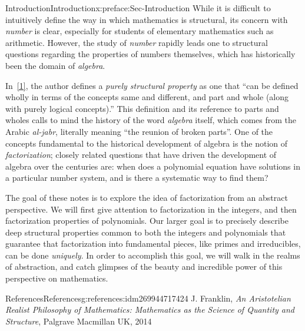 \documentclass[oneside,10pt,]{book}
\numberwithin{equation}{section}
\begin{document}
\begin{preface}{Introduction}{}{Introduction}{}{}{x:preface:Sec-Introduction}
While it is difficult to intuitively define the way in which mathematics is structural, its concern with \emph{number} is clear, especially for students of elementary mathematics such as arithmetic. However, the study of \emph{number} rapidly leads one to structural questions regarding the properties of numbers themselves, which has historically been the domain of \emph{algebra}.%
\par
In~\hyperlink{x:biblio:franklin2014aristotelian}{[1]}, the author defines a \emph{purely structural property} as one that ``can be defined wholly in terms of the concepts same and different, and part and whole (along with purely logical concepts).'' This definition and its reference to parts and wholes calls to mind the history of the word \emph{algebra} itself, which comes from the Arabic \emph{al-jabr}, literally meaning ``the reunion of broken parts''. One of the concepts fundamental to the historical development of algebra is the notion of \emph{factorization}; closely related questions that have driven the development of algebra over the centuries are: when does a polynomial equation have solutions in a particular number system, and is there a systematic way to find them?%
\par
The goal of these notes is to explore the idea of factorization from an abstract perspective. We will first give attention to factorization in the integers, and then factorization properties of polynomials. Our larger goal is to precisely describe deep structural properties common to both the integers and polynomials that guarantee that factorization into fundamental pieces, like primes and irreducibles, can be done \emph{uniquely}. In order to accomplish this goal, we will walk in the realms of abstraction, and catch glimpses of the beauty and incredible power of this perspective on mathematics.%
%
%
\typeout{************************************************}
\typeout{************************************************}
%
\begin{references--numberless}{References}{}{References}{}{}{g:references:idm269944717424}
J. Franklin, \emph{An Aristotelian Realist Philosophy of Mathematics: Mathematics as the Science of Quantity and Structure}, Palgrave Macmillan UK, 2014\end{references--numberless}
\end{preface}
%
%
\typeout{************************************************}
\end{document}
